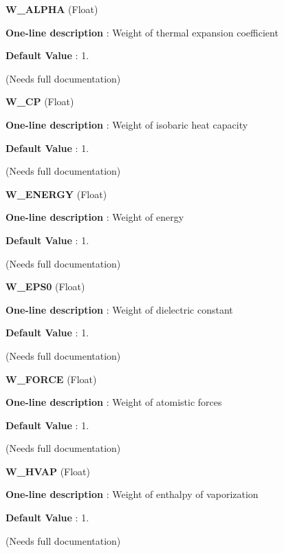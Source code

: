 \begin{DoxyItemize}
\item {\bfseries  W\-\_\-\-A\-L\-P\-H\-A } (Float) \par
{\bfseries  One-\/line description }\-: Weight of thermal expansion coefficient \par
{\bfseries  Default Value }\-: 1. \par
(Needs full documentation)\end{DoxyItemize}
\begin{DoxyItemize}
\item {\bfseries  W\-\_\-\-C\-P } (Float) \par
{\bfseries  One-\/line description }\-: Weight of isobaric heat capacity \par
{\bfseries  Default Value }\-: 1. \par
(Needs full documentation)\end{DoxyItemize}
\begin{DoxyItemize}
\item {\bfseries  W\-\_\-\-E\-N\-E\-R\-G\-Y } (Float) \par
{\bfseries  One-\/line description }\-: Weight of energy \par
{\bfseries  Default Value }\-: 1. \par
(Needs full documentation)\end{DoxyItemize}
\begin{DoxyItemize}
\item {\bfseries  W\-\_\-\-E\-P\-S0 } (Float) \par
{\bfseries  One-\/line description }\-: Weight of dielectric constant \par
{\bfseries  Default Value }\-: 1. \par
(Needs full documentation)\end{DoxyItemize}
\begin{DoxyItemize}
\item {\bfseries  W\-\_\-\-F\-O\-R\-C\-E } (Float) \par
{\bfseries  One-\/line description }\-: Weight of atomistic forces \par
{\bfseries  Default Value }\-: 1. \par
(Needs full documentation)\end{DoxyItemize}
\begin{DoxyItemize}
\item {\bfseries  W\-\_\-\-H\-V\-A\-P } (Float) \par
{\bfseries  One-\/line description }\-: Weight of enthalpy of vaporization \par
{\bfseries  Default Value }\-: 1. \par
(Needs full documentation)\end{DoxyItemize}
